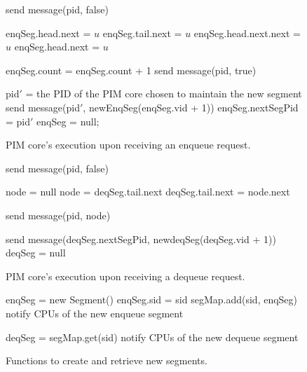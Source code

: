 \documentclass[11pt, letterpaper]{article}   	%
\begin{document}
\begin{figure}
\begin{algorithm}[H]
\Begin
{
    {
        send message(pid, false)\;
    }
    {
        {
            enqSeg.head.next = $u$\;
            enqSeg.tail.next = $u$\;
        }
        {
            enqSeg.head.next.next = $u$\;
            enqSeg.head.next = $u$\;
        }

        enqSeg.count = enqSeg.count + 1\;
        send message(pid, true)\;

        {
            pid$'$ = the PID of the PIM core chosen to maintain the new segment\;
            send message(pid$'$, newEnqSeg(enqSeg.vid + 1))\;
            enqSeg.nextSegPid = pid$'$\;
            enqSeg = null;
        }
    }
}
\end{algorithm}
\caption{PIM core's execution upon receiving an enqueue request.}
\label{figure:enq}
\end{figure}

\begin{figure}
\begin{algorithm}[H]
\Begin
{
    {
        send message(pid, false)\;
    }
    {
        {
            node = null\;
        }
        {
            node = deqSeg.tail.next\;
            deqSeg.tail.next = node.next\;
        }

        send message(pid, node)\;

        {
            {
                send message(deqSeg.nextSegPid, newdeqSeg(deqSeg.vid + 1))\;
                deqSeg = null\;
            }
        }
    }
}
\end{algorithm}
\caption{PIM core's execution upon receiving a dequeue request.}
\label{figure:deq}
\end{figure}

\begin{figure}
\begin{algorithm}[H]
\Begin
{
    enqSeg = new Segment() \;
    enqSeg.sid = sid \;
    segMap.add(sid, enqSeg) \;
    notify CPUs of the new enqueue segment\;
}
\end{algorithm}

\begin{algorithm}[H]
\Begin
{
    deqSeg = segMap.get(sid) \;
    notify CPUs of the new dequeue segment\;
}
\end{algorithm}	

\caption{Functions to create and retrieve new segments.}
\label{figure:newSegment}
\end{figure}
\end{document}
